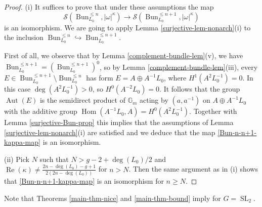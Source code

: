 \documentclass[12pt,reqno]{amsart}
\theoremstyle{definition}
\theoremstyle{remark}
\numberwithin{equation}{section}
\newcommand{\Aut}{\operatorname{Aut}}
\newcommand{\hra}{\hookrightarrow}
\newcommand{\Hom}{\operatorname{Hom}}
\renewcommand{\SS}{{\mathcal S}}
\newcommand{\om}{\omega}
\newcommand{\G}{{\mathbb G}}
\newcommand{\SL}{{\operatorname{SL}}}
\newcommand{\Bun}{{\operatorname{Bun}}}
\renewcommand{\Re}{{\operatorname{Re}}}
\begin{document}
\begin{proof}
(i) It suffices to prove that under these assumptions the map
\begin{equation}\label{Bun-n-n+1-kappa-map}
\SS(\Bun_{L_0}^{\le n},|\om|^{\kappa})\to \SS(\Bun_{L_0}^{\le n+1},|\om|^{\kappa})
\end{equation}
is an isomorphism. We are going to apply Lemma \ref{surjective-lem-nonarch}(i) to the inclusion $\Bun_{L_0}^{\le n}\hra \Bun_{L_0}^{\le n+1}$.

First of all, we observe that by Lemma \ref{complement-bundle-lem}(v), we have
$\Bun_{L_0}^{\le n+1}=(\Bun_{L_0}^{\le n+1})^0$, so by Lemma \ref{complement-bundle-lem}(iii), every
$E\in \Bun_{L_0}^{\le n+1}\setminus \Bun_{L_0}^{\le n}$ has form $E=A\oplus A^{-1}L_0$, where $H^1(A^2L_0^{-1})=0$. In this case $\deg(A^2L_0^{-1})>0$,
so $H^0(A^{-2}L_0)=0$. It follows that the group $\Aut(E)$ is the semidirect product of $\G_m$ acting by $(a,a^{-1})$ on $A\oplus A^{-1}L_0$ with the additive group
$\Hom(A^{-1}L_0,A)=H^0(A^2L_0^{-1})$. Together with Lemma \ref{surjective-Bun-prop} this implies that the assumptions of Lemma \ref{surjective-lem-nonarch}(i) are
satisfied and we deduce that the map \eqref{Bun-n-n+1-kappa-map} is an isomorphism.

\noindent
(ii) Pick $N$ such that $N>g-2+\deg(L_0)/2$ and $\Re(\kappa)\neq \frac{2n-\deg(L_0)-g+1}{2(2n-\deg(L_0))}$
for $n>N$. Then the same argument as in (i) shows that \eqref{Bun-n-n+1-kappa-map} is an isomorphism for $n\ge N$.
\end{proof}

Note that Theorems \ref{main-thm-nice} and \ref{main-thm-bound} imply \cite[Conj.\ 3.5(1)]{BK} for $G=\SL_2$.
\end{document}

